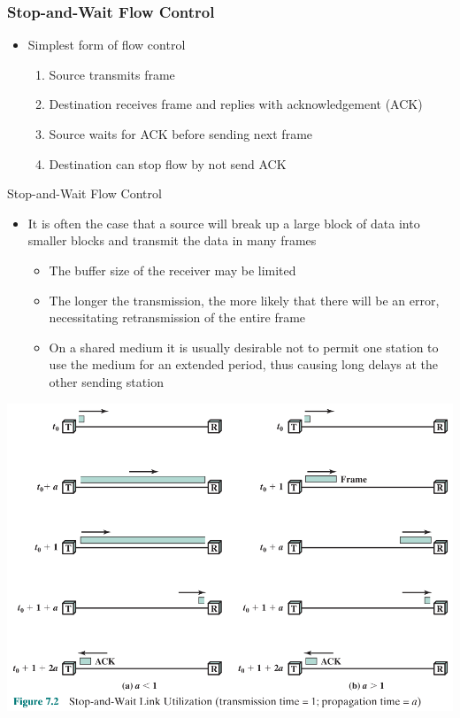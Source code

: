\documentclass[pdflatex,compress]{beamer}
\begin{document}
\begin{frame}
	\frametitle{Stop-and-Wait Flow Control}
	\begin{itemize}
		\item Simplest form of flow control
		\begin{enumerate}
			\item Source transmits frame
			\item Destination receives frame and replies with acknowledgement (ACK)
			\item Source waits for ACK before sending next frame
			\item Destination can stop flow by not send ACK
		\end{enumerate}
	\end{itemize}
\end{frame}

\begin{frame}{Stop-and-Wait Flow Control}
	\begin{itemize}
		\item It is often the case that a source will break up a large block of data into smaller blocks and transmit the data in many frames
		\begin{itemize}
			\item The buffer size of the receiver may be limited
			\item The longer the transmission, the more likely that there will be an error, necessitating retransmission of the entire frame
			\item On a shared medium it is usually desirable not to permit one station to use the medium for an extended period, thus causing long delays at the other sending station
		\end{itemize}
	\end{itemize}
\end{frame}

\begin{frame}
	\begin{center}
		\includegraphics[width=0.9\linewidth]{img/img02}
	\end{center}
\end{frame}
\end{document}
